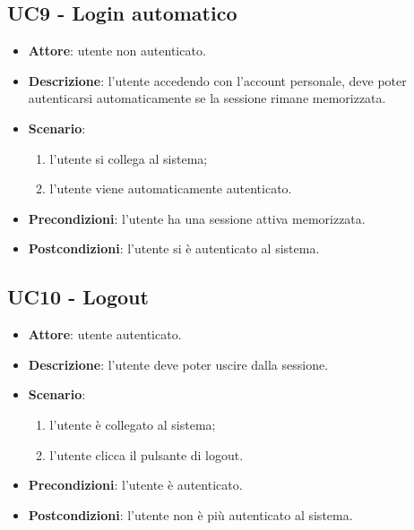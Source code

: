\subsection{UC9 - Login automatico}
\begin{itemize}
    \item \textbf{Attore}: utente non autenticato.
    \item \textbf{Descrizione}: l'utente accedendo con l'account personale, deve poter autenticarsi automaticamente se la sessione rimane memorizzata.
    \item \textbf{Scenario}:
    \begin{enumerate}
        \item l'utente si collega al sistema;
        \item l'utente viene automaticamente autenticato.
    \end{enumerate}

    \item \textbf{Precondizioni}: l'utente ha una sessione attiva memorizzata.
    \item \textbf{Postcondizioni}: l'utente si è autenticato al sistema.
\end{itemize}

\subsection{UC10 - Logout}
\begin{itemize}
    \item \textbf{Attore}: utente autenticato.
    \item \textbf{Descrizione}: l'utente deve poter uscire dalla sessione.
    \item \textbf{Scenario}:
    \begin{enumerate}
        \item l'utente è collegato al sistema;
        \item l'utente clicca il pulsante di logout.
    \end{enumerate}

    \item \textbf{Precondizioni}: l'utente è autenticato.
    \item \textbf{Postcondizioni}: l'utente non è più autenticato al sistema.
\end{itemize}

